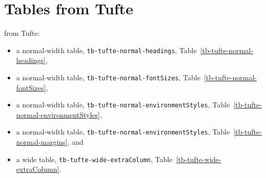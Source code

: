 %
\section{Tables from Tufte}
\label{chap-Tables-Tufte}

  from Tufte:
\lipsum[4]
\begin{itemize}
\item
a normal-width table, {\tt tb-tufte-normal-headings}, Table~\ref{tb-tufte-normal-headings}, 
\item
a normal-width table, {\tt tb-tufte-normal-fontSizes}, Table~\ref{tb-tufte-normal-fontSizes},
\item
a normal-width table, {\tt tb-tufte-normal-environmentStyles}, Table~\ref{tb-tufte-normal-environmentStyles},  
\item
a normal-width table, {\tt tb-tufte-normal-environmentStyles}, Table~\ref{tb-tufte-normal-margins}, and
\item
a wide table, {\tt tb-tufte-wide-extraColumn}, Table~\ref{tb-tufte-wide-extraColumn}.
\end{itemize}









